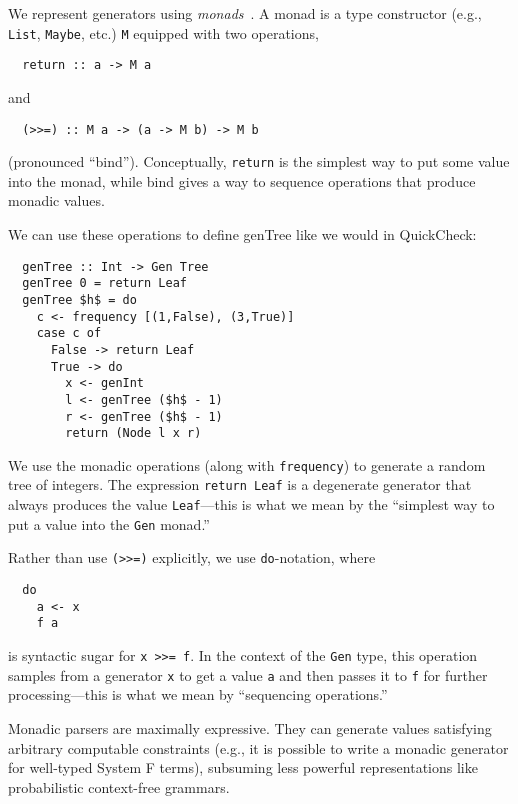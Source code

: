 We represent generators using {\em monads\/}~\cite{moggi1991notions}. A monad is
a type constructor (e.g., \lstinline{List}, \lstinline{Maybe}, etc.)
\lstinline{M} equipped with two operations,
\begin{lstlisting}
  return :: a -> M a
\end{lstlisting}
\noindent and
\begin{lstlisting}
  (>>=) :: M a -> (a -> M b) -> M b
\end{lstlisting}
\noindent (pronounced ``bind''). Conceptually, \lstinline{return} is the
simplest way to put some value into the monad, while bind gives a way to
sequence operations that produce monadic values.

We can use these operations to define {\sf genTree} like we would in QuickCheck:
\begin{lstlisting}
  genTree :: Int -> Gen Tree
  genTree 0 = return Leaf
  genTree $h$ = do
    c <- frequency [(1,False), (3,True)]
    case c of
      False -> return Leaf
      True -> do
        x <- genInt
        l <- genTree ($h$ - 1)
        r <- genTree ($h$ - 1)
        return (Node l x r)
\end{lstlisting}
We use the monadic operations (along with \lstinline{frequency}) to generate a
random tree of integers. The expression \lstinline{return Leaf} is a degenerate
generator that always produces the value \lstinline{Leaf}---this is what we mean
by the ``simplest way to put a value into the \lstinline{Gen} monad.''

Rather than use \lstinline{(>>=)} explicitly, we use \lstinline{do}-notation,
where
\begin{lstlisting}
  do
    a <- x
    f a
\end{lstlisting}
\noindent is syntactic sugar for \lstinline{x >>= f}. In the context of the
\lstinline{Gen} type, this operation samples from a generator \lstinline{x} to
get a value \lstinline{a} and then passes it to \lstinline{f} for further
processing---this is what we mean by ``sequencing operations.''

\smallskip

Monadic parsers are maximally expressive.  They can generate values satisfying
arbitrary computable constraints (e.g., it is possible to write a monadic
generator for well-typed System F terms), subsuming less powerful
representations like probabilistic context-free grammars.

